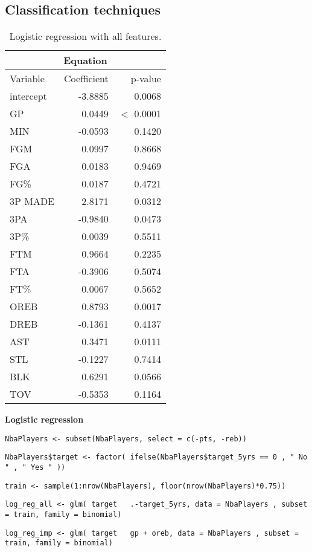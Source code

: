 \subsection*{Classification techniques}\label{appendix:ct}

\begin{table}[H]
	\centering
	\begin{tabular}{|| l | r | r ||} 
		\hline
		\multicolumn{3}{|c|}{Equation} \\
		\hline
		Variable & Coefficient & p-value \\
		\hline
		intercept & -3.8885 & 0.0068 \\
		GP & 0.0449 & $<$ 0.0001 \\
		MIN & -0.0593 & 0.1420 \\
		FGM & 0.0997 & 0.8668 \\
		FGA & 0.0183 & 0.9469 \\
		FG\% & 0.0187 & 0.4721 \\
		3P MADE & 2.8171 & 0.0312 \\
		3PA & -0.9840 & 0.0473 \\
		3P\% & 0.0039 & 0.5511 \\
		FTM & 0.9664 & 0.2235 \\
		FTA & -0.3906 & 0.5074 \\
		FT\% & 0.0067 & 0.5652 \\
		OREB & 0.8793 & 0.0017 \\
		DREB & -0.1361 & 0.4137 \\
		AST & 0.3471 & 0.0111 \\
		STL & -0.1227 & 0.7414 \\
		BLK & 0.6291 & 0.0566 \\				
		TOV & -0.5353 & 0.1164 \\		
		\hline
	\end{tabular}
	\caption{Logistic regression with all features.}
	\label{table:LRAllSum}
\end{table}

\noindent
\textbf{Logistic regression}

\begin{center}
\texttt{NbaPlayers <- subset(NbaPlayers, select = c(-pts, -reb))}

\texttt{NbaPlayers\$target <- factor( ifelse(NbaPlayers\$target\_5yrs == 0 , " No " , " Yes " ))}

\texttt{train <- sample(1:nrow(NbaPlayers), floor(nrow(NbaPlayers)*0.75))}

\texttt{log\_reg\_all <- glm( target ~ .-target\_5yrs, data = NbaPlayers , subset = train, family = binomial)}

\texttt{log\_reg\_imp <- glm( target ~ gp + oreb, data = NbaPlayers , subset = train, family = binomial)}
\end{center}

